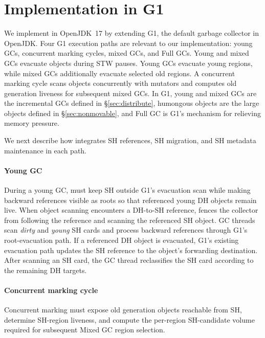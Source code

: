 \section{\chipperName{} Implementation in G1}
\label{chipper:sec:impl}

We implement \chipperName{} in OpenJDK~17 by extending G1, the default garbage collector in OpenJDK.
Four G1 execution paths are relevant to our implementation: young GCs, concurrent marking cycles, mixed GCs, and Full GCs.
Young and mixed GCs evacuate objects during STW pauses.
Young GCs evacuate young regions, while mixed GCs additionally evacuate selected old regions.
A concurrent marking cycle scans objects concurrently with mutators and computes old generation liveness for subsequent mixed GCs.
In G1, young and mixed GCs are the incremental GCs defined in \S\ref{sec:distribute}, humongous objects are the large objects defined in \S\ref{sec:nonmovable}, and Full GC is G1's mechanism for relieving memory pressure.

We next describe how \chipperName{} integrates SH references, SH migration, and SH metadata maintenance in each path.

\paragraph{\textbf{Young GC}}
During a young GC, \chipperName{} must keep SH outside G1's evacuation scan while making backward references visible as roots so that referenced young DH objects remain live.
When object scanning encounters a DH-to-SH reference, \chipperName{} fences the collector from following the reference and scanning the referenced SH object.
GC threads scan \emph{dirty} and \emph{young} SH cards and process backward references through G1's root-evacuation path.
If a referenced DH object is evacuated, G1's existing evacuation path updates the SH reference to the object's forwarding destination.
After scanning an SH card, the GC thread reclassifies the SH card according to the remaining DH targets.

\paragraph{\textbf{Concurrent marking cycle}}
Concurrent marking must expose old generation objects reachable from SH, determine SH-region liveness, and compute the per-region SH-candidate volume required for subsequent Mixed GC region selection.

